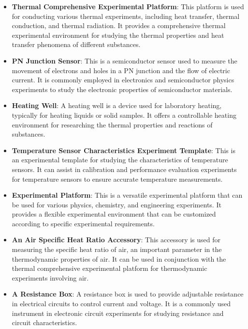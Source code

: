 \documentclass[UTF8]{article}
\begin{document}
            
    \begin{itemize}
      \item \textbf{Thermal Comprehensive Experimental Platform}: This platform is used for conducting various thermal experiments, including heat transfer, thermal conduction, and thermal radiation. It provides a comprehensive thermal experimental environment for studying the thermal properties and heat transfer phenomena of different substances.
      
      \item \textbf{PN Junction Sensor}: This is a semiconductor sensor used to measure the movement of electrons and holes in a PN junction and the flow of electric current. It is commonly employed in electronics and semiconductor physics experiments to study the electronic properties of semiconductor materials.
      
      \item \textbf{Heating Well}: A heating well is a device used for laboratory heating, typically for heating liquids or solid samples. It offers a controllable heating environment for researching the thermal properties and reactions of substances.
      
      \item \textbf{Temperature Sensor Characteristics Experiment Template}: This is an experimental template for studying the characteristics of temperature sensors. It can assist in calibration and performance evaluation experiments for temperature sensors to ensure accurate temperature measurements.
      
      \item \textbf{Experimental Platform}: This is a versatile experimental platform that can be used for various physics, chemistry, and engineering experiments. It provides a flexible experimental environment that can be customized according to specific experimental requirements.
      
      \item \textbf{An Air Specific Heat Ratio Accessory}: This accessory is used for measuring the specific heat ratio of air, an important parameter in the thermodynamic properties of air. It can be used in conjunction with the thermal comprehensive experimental platform for thermodynamic experiments involving air.
      
      \item \textbf{A Resistance Box}: A resistance box is used to provide adjustable resistance in electrical circuits to control current and voltage. It is a commonly used instrument in electronic circuit experiments for studying resistance and circuit characteristics.
    \end{itemize}
    
\end{document}
